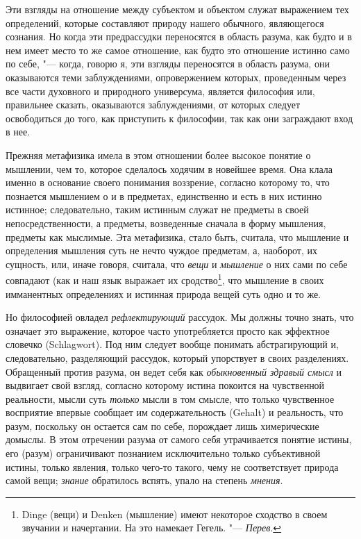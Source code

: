 Эти взгляды на отношение между субъектом и объектом служат выражением тех
определений, которые составляют природу нашего обычного, являющегося
сознания. Но когда эти предрассудки переносятся в область разума, как будто
и в нем имеет место то же самое отношение, как будто это отношение истинно
само по себе, "--- когда, говорю я, эти взгляды переносятся в область разума,
они оказываются теми заблуждениями, опровержением которых, проведенным
через все части духовного и природного универсума, является философия или,
правильнее сказать, оказываются заблуждениями, от которых следует
освободиться до того, как приступить к философии, так как они заграждают
вход в нее.

Прежняя метафизика имела в этом отношении более высокое понятие о мышлении,
чем то, которое сделалось ходячим в новейшее время. Она клала именно в
основание своего понимания воззрение, согласно которому то, что познается
мышлением о и в предметах, единственно и есть в них истинно истинное;
следовательно, таким истинным служат не предметы в своей
непосредственности, а предметы, возведенные сначала в форму мышления,
предметы как мыслимые. Эта метафизика, стало быть, считала, что мышление и
определения мышления суть не нечто чуждое предметам, а, наоборот, их
сущность, или, иначе говоря, считала, что {\em вещи} и
{\em мышление} о них сами по себе совпадают (как и наш
язык выражает их сродство\footnote{Dinge (вещи) и Denken (мышление) имеют
некоторое сходство в своем звучании и начертании. На это намекает
Гегель. "--- {\em Перев}.}, что мышление в своих имманентных определениях
и истинная природа вещей суть одно и то же.

Но философией овладел {\em рефлектирующий} рассудок. Мы
должны точно знать, что означает это выражение, которое часто употребляется
просто как эффектное словечко (Schlagwort). Под ним следует вообще понимать
абстрагирующий и, следовательно, разделяющий рассудок, который упорствует в
своих разделениях. Обращенный против разума, он ведет себя как
{\em обыкновенный здравый смысл} и выдвигает свой
взгляд, согласно которому истина покоится на чувственной реальности, мысли
суть {\em только} мысли в том смысле, что только
чувственное восприятие впервые сообщает им содержательность (Gehalt) и
реальность, что разум, поскольку он остается сам по себе, порождает лишь
химерические домыслы.
В этом отречении разума от самого себя утрачивается понятие истины, его
(разум) ограничивают познанием исключительно только субъективной истины,
только явления, только чего-то такого, чему не соответствует природа самой
вещи; {\em знание} обратилось вспять, упало на степень {\em мнения}.

